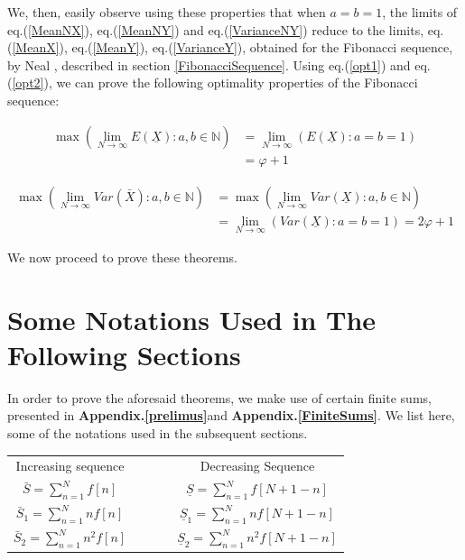 \begin{multicols}{2}
We, then, easily observe using these properties that when $a = b = 1$, the limits of eq.(\ref{MeanNX}), eq.(\ref{MeanNY}) and eq.(\ref{VarianceNY}) reduce to the limits, eq.(\ref{MeanX}), eq.(\ref{MeanY}), eq.(\ref{VarianceY}), obtained for the Fibonacci sequence, by Neal \cite{art1-key01}, described in section \ref{FibonacciSequence}. Using eq.(\ref{opt1}) and eq.(\ref{opt2}), we can prove the following optimality properties of the Fibonacci sequence:
\begin{thm}
 \label{thm-5}
\begin{align*}
\max{\left(\lim_{N\rightarrow \infty} E(\underline{X}): a, b \in \mathbb N \right)} &= \lim_{N \rightarrow \infty}\left(E(\underline{X}):a=b=1\right)\\
 &= \varphi + 1
\end{align*}
\end{thm}
\begin{thm}
\label{thm-6}
{\fontsize{7.3}{8.3}\selectfont\begin{align*}
\max{\left (\lim_{N\rightarrow \infty}Var(\bar{X}): a,b \in \mathbb N\right)} &=\max{\left(\lim_{N\rightarrow \infty}Var(\underline{X}): a,b \in \mathbb N\right)}\\
&= \lim_{N \rightarrow \infty}\left(Var(\underline{X}):a=b=1\right)= 2\varphi + 1
\end{align*}}
 \end{thm}

\vspace{-.5cm}

We now proceed to prove these theorems.

\vspace{-.5cm}

\section{Some Notations Used in The\\ Following Sections}\label{section-5}
In order to prove the aforesaid theorems, we make use of certain finite sums, presented in \textbf{Appendix.\ref{prelimus}}\break and \textbf{Appendix.\ref{FiniteSums}}. We list here, some of the notations used in the subsequent sections.

\begin{tabular}{cccc}
  Increasing sequence & ~ &~& Decreasing Sequence\\[.2cm]
 $\bar{S} = \displaystyle{\sum_{n=1}^{N}}f[n]$& ~ &~& $\underline{S} = \displaystyle{\sum_{n=1}^{N}}f[N+1-n]$ \\
 $\bar{S}_1 = \displaystyle{\sum_{n=1}^{N}}n f[n]$ & ~ &~& $\underline{S}_1 = \displaystyle{\sum_{n=1}^{N}}n f[N+1-n]$ \\
 $\bar{S}_2 = \displaystyle{\sum_{n=1}^{N}}n^2 f[n]$ &~& ~&$\underline{S}_2 = \displaystyle{\sum_{n=1}^{N}}n^2 f[N+1-n]$ 
\end{tabular}


\end{multicols}
